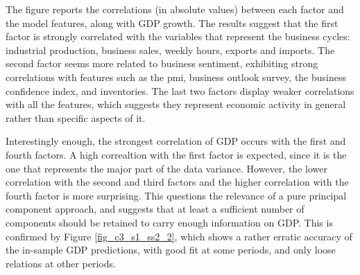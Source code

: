The figure reports the correlations (in absolute values) between each factor and the model features, along with GDP growth. The results suggest that the first factor is strongly correlated with the variables that represent the business cycles: industrial production, business sales, weekly hours, exports and imports. The second factor seems more related to business sentiment, exhibiting strong correlations with features such as the pmi, business outlook survey, the business confidence index, and inventories. The last two factors display weaker correlations with all the features, which suggests they represent economic activity in general rather than specific aspects of it. 

Interestingly enough, the strongest correlation of GDP occurs with the first and fourth factors. A high correaltion with the first factor is expected, since it is the one that represents the major part of the data variance. However, the lower correlation with the second and third factors and the higher correlation with the fourth factor is more surprising. This questions the relevance of a pure principal component approach, and suggests that at least a sufficient number of components should be retained to carry enough information on GDP. This is confirmed by Figure \ref{fig_c3_s1_ss2_2}, which shows a rather erratic accuracy of the in-sample GDP predictions, with good fit at some periods, and only loose relations at other periods.








